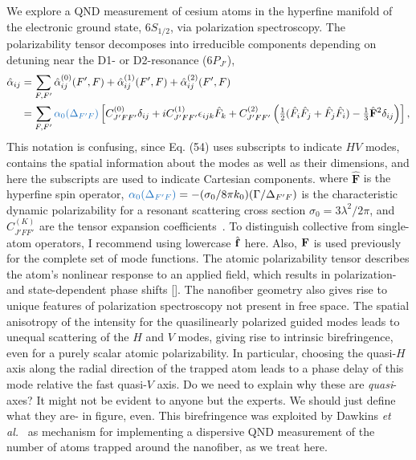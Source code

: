 \documentclass[preprint,aps,pra,onecolumn]{revtex4-1} %
\newcommand{\charpol}{\alpha_0(\Delta_{F'F})}
\newcommand{\change}[1]{{\color{RoyalBlue} #1}}
\newcommand{\comment}[1]{{\color{Maroon} #1}}
\begin{document}
We explore a QND measurement of cesium atoms in the hyperfine manifold of the electronic ground state, $6S_{1/2}$, via polarization spectroscopy.  The polarizability tensor decomposes into irreducible components depending on detuning near the D1- or D2-resonance ($6P_{J'}$),
\comment{
\begin{align}
\hat{\alpha}_{ij} &= \sum_{F,F'} \hat{\alpha}_{ij}^{(0)}(F',F)+\hat{\alpha}_{ij}^{(1)}(F',F)+\hat{\alpha}_{ij}^{(2)}(F',F)\\
&=\sum_{F,F'} \change{\charpol} \left[ C_{J'FF'}^{(0)} \delta_{ij}+ iC_{J'FF'}^{(1)}\epsilon_{ijk}\hat{F}_k+ C_{J'FF'}^{(2)}\left(\smallfrac{1}{2} ( \hat{F}_i\hat{F}_j +\hat{F}_j\hat{F}_i )-\smallfrac{1}{3}\hat{\mathbf{F}}^2 \delta_{ij} \right) \right], \label{Eq::PolarizabilityIrrep}
\end{align}
This notation is confusing, since Eq. (54) uses subscripts to indicate $HV$ modes, contains the spatial information about the modes as well as their dimensions, and here the subscripts are used to indicate Cartesian components.} where $\hat{\mathbf{F}}$ is the hyperfine spin operator, $\change{\charpol} = -(\sigma_0/8\pi k_0) (\Gamma/\Delta_{F'F})$ is the characteristic dynamic polarizability for a resonant scattering cross section $\sigma_0 = 3 \lambda^2/2\pi$, and $C_{J'FF'}^{(K)}$ are the tensor expansion coefficients~\cite{deutsch_quantum_2010}.  \change{ To distinguish collective from single-atom operators, I recommend using lowercase $\hat{\mathbf{f}}$ here.  Also, $\mathbf{F}$ is used previously for the complete set of mode functions.}  The atomic polarizability tensor describes the atom's nonlinear response to an applied field, which results in polarization- and state-dependent phase shifts [].  The nanofiber geometry also gives rise to unique features of polarization spectroscopy not present in free space.  The spatial anisotropy of the intensity for the quasilinearly polarized guided modes leads to unequal scattering of the $H$ and $V$ modes, giving rise to intrinsic birefringence, even for a purely scalar atomic polarizability.  In particular, choosing the quasi-$H$ axis along the radial direction of the trapped atom leads to a phase delay of this mode relative the fast quasi-$V$ axis.  \change{ Do we need to explain why these are \emph{quasi}-axes?  It might not be evident to anyone but the experts.  We should just define what they are- in figure, even.} This birefringence was exploited by Dawkins {\em et al.}~\cite{dawkins_dispersive_2011} as mechanism for implementing a dispersive QND measurement of the number of atoms trapped around the nanofiber, as we treat here.
\end{document}
